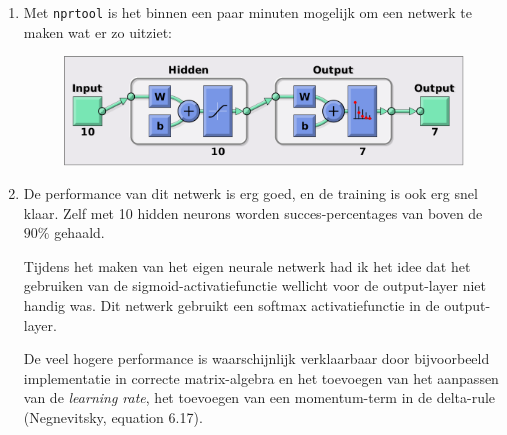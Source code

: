 \documentclass[a4paper,10pt,fleqn]{article}
\begin{document}
\begin{enumerate}[1.]
	\item Met \verb|nprtool| is het binnen een paar minuten mogelijk om een netwerk te maken wat er zo uitziet:

	\begin{figure}[!h]
		\centering
		\includegraphics[width=.8\textwidth]{nprtool-diagram}
	\end{figure}

	\item De performance van dit netwerk is erg goed, en de training is ook erg snel klaar. Zelf met 10 hidden neurons worden succes-percentages van boven de $90\%$ gehaald.

	Tijdens het maken van het eigen neurale netwerk had ik het idee dat het gebruiken van de sigmoid-activatiefunctie wellicht voor de output-layer niet handig was. Dit netwerk gebruikt een softmax activatiefunctie in de output-layer.

	De veel hogere performance is waarschijnlijk verklaarbaar door bijvoorbeeld implementatie in correcte matrix-algebra en het toevoegen van het aanpassen van de \textit{learning rate}, het toevoegen van een momentum-term in de delta-rule (Negnevitsky, equation 6.17).
\end{enumerate}
\end{document}
